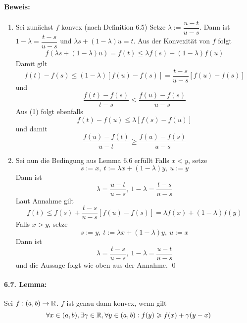  \paragraph{Beweis:}
 \begin{enumerate}[label=\Roman*.]
     \item Sei zun\"achst $f$ konvex (nach Definition 6.5)\newline
     Setze $\lambda:=\dfrac{u-t}{u-s}$. Dann ist $1-\lambda=\dfrac{t-s}{u-s}$ und $\lambda s+(1-\lambda)u=t$. Aus der Konvexit\"at von $f$ folgt
     \begin{gather}
         f(\lambda s+(1-\lambda)u)=f(t)\leq\lambda f(s)+(1-\lambda)f(u)
     \end{gather}
     Damit gilt
     $$f(t)-f(s)\leq(1-\lambda)[f(u)-f(s)]=\dfrac{t-s}{u-s}[f(u)-f(s)]$$
     und
     $$\dfrac{f(t)-f(s)}{t-s}\leq\dfrac{f(u)-f(s)}{u-s}$$
     Aus (1) folgt ebenfalls
     $$f(t)-f(u)\leq\lambda[f(s)-f(u)]$$
     und damit 
     $$\dfrac{f(u)-f(t)}{u-t}\geq\dfrac{f(u)-f(s)}{u-s}$$
     \item Sei nun die Bedingung aus Lemma 6.6 erf\"ullt\newline
     Falls $x<y$, setze 
     $$s:=x,\ t:=\lambda x+(1-\lambda)y,\ u:= y$$ 
     Dann ist
     $$\lambda = \dfrac{u-t}{u-s},\ 1-\lambda=\dfrac{t-s}{u-s}$$
     Laut Annahme gilt
     $$f(t)\leq f(s)+\dfrac{t-s}{u-s}[f(u)-f(s)]=\lambda f(x)+(1-\lambda)f(y)$$
     Falls $x>y$, setze
     $$s:=y,\ t:=\lambda x+(1-\lambda)y,\ u:=x$$
     Dann ist
     $$\lambda=\dfrac{t-s}{u-s},\ 1-\lambda=\dfrac{u-t}{u-s}$$
     und die Aussage folgt wie oben aus der Annahme. \qed
 \end{enumerate}
 
 \paragraph{6.7. Lemma:}Sei $f:(a,b)\to\mathbb{R}$. $f$ ist genau dann konvex, wenn gilt
 $$\forall x\in(a,b),\exists\gamma\in\mathbb{R},\forall y\in(a,b):f(y)\geqslant f(x)+\gamma(y-x)$$
 
